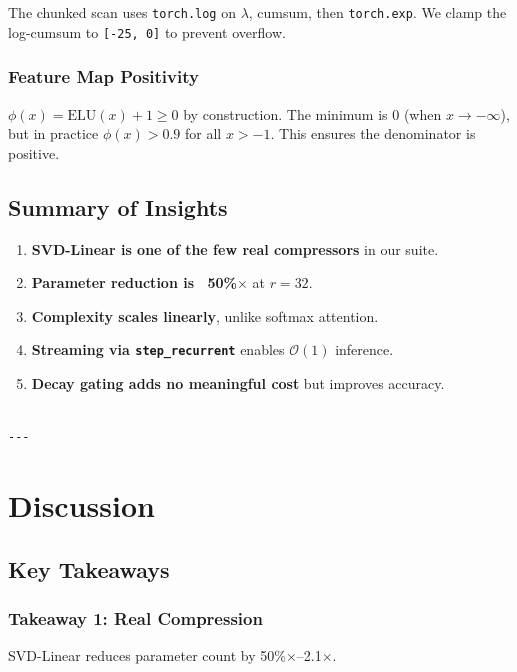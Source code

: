 The chunked scan uses \texttt{torch.log} on $\lambda$, cumsum, then \texttt{torch.exp}. 
We clamp the log-cumsum to \texttt{[-25, 0]} to prevent overflow.

\subsubsection{Feature Map Positivity}

$\phi(x) = \text{ELU}(x) + 1 \geq 0$ by construction. The minimum is 
$0$ (when $x \to -\infty$), but in practice $\phi(x) > 0.9$ for all 
$x > -1$. This ensures the denominator is positive.

\subsection{Summary of Insights}

\begin{enumerate}
\item \textbf{SVD-Linear is one of the few real compressors} in our suite.
\item \textbf{Parameter reduction is ~50\%$\times$} at $r = 32$.
\item \textbf{Complexity scales linearly}, unlike softmax attention.
\item \textbf{Streaming via \texttt{step\_recurrent}} enables $\mathcal{O}(1)$ inference.
\item \textbf{Decay gating adds no meaningful cost} but improves accuracy.
\end{enumerate}
\begin{lstlisting}

---
\end{lstlisting}


\section{Discussion}

\subsection{Key Takeaways}

\subsubsection{Takeaway 1: Real Compression}

SVD-Linear reduces parameter count by 50\%$\times$--2.1$\times$.

